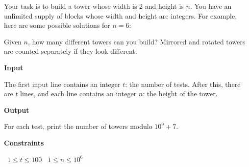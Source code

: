 Your task is to build a tower whose width is $2$ and height is $n$. You have an unlimited supply of blocks whose width and height are integers.
For example, here are some possible solutions for $n=6$:

Given $n$, how many different towers can you build? Mirrored and rotated towers are counted separately if they look different.

\vspace{0.3cm}\noindent\textbf{Input}

The first input line contains an integer $t$: the number of tests.
After this, there are $t$ lines, and each line contains an integer $n$: the height of the tower.

\vspace{0.3cm}\noindent\textbf{Output}

For each test, print the number of towers modulo $10^9+7$.

\vspace{0.3cm}\noindent\textbf{Constraints}

\textbullet\ $1 \le t \le 100$
\textbullet\ $1 \le n \le 10^6$